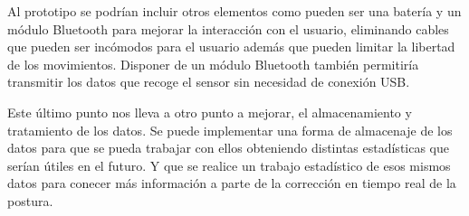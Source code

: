 Al prototipo se podrían incluir otros elementos como pueden ser una batería y un módulo Bluetooth para mejorar la interacción con el usuario, eliminando cables que pueden ser incómodos para el usuario además que pueden limitar la libertad de los movimientos. Disponer de un módulo Bluetooth también permitiría transmitir los datos que recoge el sensor sin necesidad de conexión USB. 

Este último punto nos lleva a otro punto a mejorar, el almacenamiento y tratamiento de los datos. Se puede implementar una forma de almacenaje de los datos para que se pueda trabajar con ellos obteniendo distintas estadísticas que serían útiles en el futuro. Y que se realice un trabajo estadístico de esos mismos datos para conecer más información a parte de la corrección en tiempo real de la postura.
